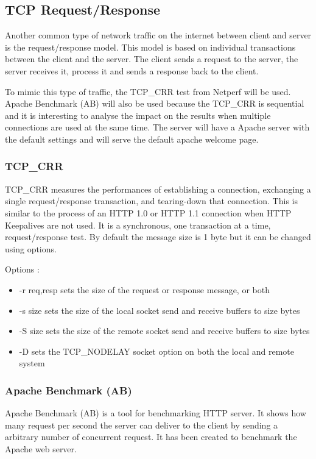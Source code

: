   \subsection{TCP Request/Response}  \label{sec:setup_request_response}

  Another common type of network traffic on the internet between client and server is the request/response model.
  This model is based on individual transactions between the client and the server.
  The client sends a request to the server, the server receives it, process it and sends a response back to the client.

  To mimic this type of traffic, the TCP\_CRR test from Netperf will be used.
  Apache Benchmark (AB) will also be used because the  TCP\_CRR is sequential and it is interesting to analyse the impact on the results when multiple connections are used at the same time.
  The server will have a Apache server with the default settings and will serve the default apache welcome page.

  \subsubsection{TCP\_CRR}

  TCP\_CRR measures the performances of establishing a connection, exchanging a single request/response transaction, and tearing-down that connection.
  This is similar to the process of an HTTP 1.0 or HTTP 1.1 connection when HTTP Keepalives are not used. It is a synchronous, one transaction at a time, request/response test.
  By default the message size is 1 byte but it can be changed using options.

  Options :
  \begin{itemize}
\item -r req,resp sets the size of the request or response message, or both
\item -s size sets the size of the local socket send and receive buffers to
size bytes
\item -S size sets the size of the remote socket send and receive buffers to
size bytes
\item -D sets the TCP\_NODELAY socket option on both the local and
remote system
  \end{itemize}

    \subsubsection{Apache Benchmark (AB)}
    Apache Benchmark (AB) is a tool for benchmarking HTTP server. It shows how many request per second the server can deliver to the client by sending a arbitrary number of concurrent request.
    It has been created to benchmark the Apache web server.

